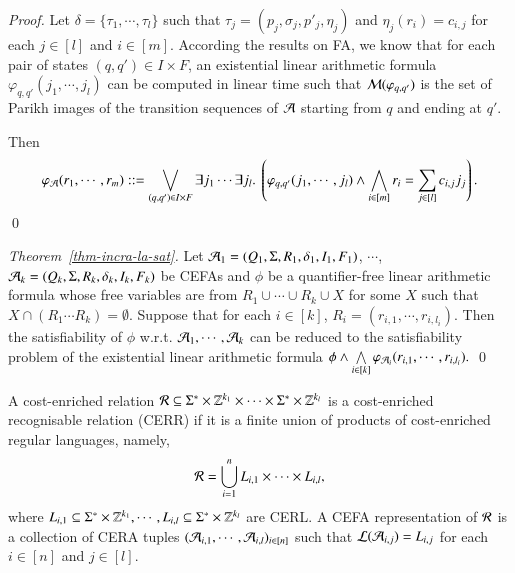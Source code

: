 \documentclass{llncs}
\begin{document}
\begin{proof}
Let $\delta = \{\tau_1, \cdots, \tau_l\}$ such that $\tau_j = (p_j, \sigma_j, p'_j, \eta_j)$ and $\eta_j(r_i) =  c_{i,j}$ for each $j \in [l]$ and $i \in [m]$.
According the results on FA, we know that for each pair of states $(q, q') \in I \times F$,  an existential linear arithmetic formula $\varphi_{q,q'}(j_1, \cdots, j_l)$ can be computed in linear time such that $\mathcal{M}(\varphi_{q,q'})$ is the set of Parikh images of the transition sequences of $\mathcal{A}$ starting from $q$ and ending at $q'$. 

Then 
\[\varphi_\Aut(r_1, \cdots, r_m) ::= \bigvee \limits_{(q,q') \in I \times F} \exists j_1 \cdots \exists j_l.\ \left(\varphi_{q,q'}(j_1, \cdots, j_l) \wedge \bigwedge \limits_{i \in [m]} r_i = \sum \limits_{j \in [l]} c_{i,j} j_j \right).\]
\qed
\end{proof}

\begin{proof}[Theorem~\ref{thm-incra-la-sat}]
Let $\mathcal{A}_1=(Q_1, \Sigma, R_1, \delta_1, I_1, F_1)$, $\cdots$, $\mathcal{A}_k=(Q_k, \Sigma, R_k, \delta_k, I_k, F_k)$ be CEFAs and $\phi$ be a quantifier-free linear arithmetic formula whose free variables are from  $R_1 \cup \cdots \cup R_k \cup X$ for some $X$ such that $X \cap (R_1 \cdots R_k) = \emptyset$.
Suppose that for each $i \in [k]$, $R_i = (r_{i, 1}, \cdots, r_{i, l_i})$. Then the satisfiability of $\phi$ w.r.t. $\mathcal{A}_1,\cdots, \mathcal{A}_k$ can be reduced to the satisfiability problem of the  existential linear arithmetic formula
$
\phi \wedge \bigwedge \limits_{i \in [k]} \varphi_{\mathcal{A}_i}(r_{i,1}, \cdots, r_{i, l_i}).
$
\qed
\end{proof}

\begin{definition}
A cost-enriched relation $\mathcal{R} \subseteq \Sigma^* \times \mathbb{Z}^{k_1} \times \cdots  \times \Sigma^* \times \mathbb{Z}^{k_l}$ is a cost-enriched recognisable relation (CERR)  if it is a finite union of products of cost-enriched regular languages, namely, 
\[\mathcal{R} = \bigcup \limits_{i=1}^n L_{i,1 } \times \cdots \times L_{i, l},\]
where $L_{i,1} \subseteq \Sigma^* \times \mathbb{Z}^{k_1}, \cdots, L_{i, l} \subseteq \Sigma^* \times \mathbb{Z}^{k_l}$ are CERL. 
A CEFA representation of $\mathcal{R}$ is a collection of CERA tuples $(\mathcal{A}_{i,1}, \cdots, \mathcal{A}_{i,l})_{i \in [n]}$ such that $\mathcal{L}(\mathcal{A}_{i,j}) = L_{i,j}$ for each $i \in [n]$ and $j \in [l]$.
\end{definition}
\end{document}
